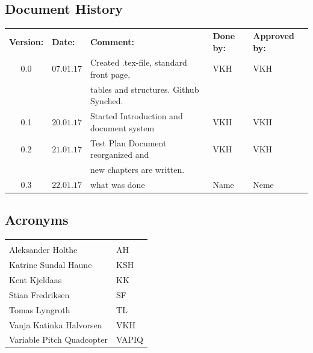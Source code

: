 \documentclass{article}
\begin{document}
\begin{center}
\section*{\textbf{Document History}}
\begin{tabular}{cllll}
\rowcolor{cadetgrey}
\textbf{Version:}    &\textbf{Date:} 	 &\textbf{Comment:}    &\textbf{Done by:}   &\textbf{Approved by:}  \\

0.0       & $07.01.17$   & Created .tex-file, standard front page, & VKH  & VKH \\
          &              & tables and structures. Github Synched.    &     & \\\rowcolor{gainsboro}
0.1       & $20.01.17$   & Started Introduction and document system  & VKH    & VKH          \\
0.2       & $21.01.17$   & Test Plan Document reorganized and  & VKH    & VKH          \\ 
          &              & new chapters are written.          &     &          \\ \rowcolor{gainsboro}
0.3       & $22.01.17$   & what was done  & Name    & Neme          \\
\end{tabular}                                                                   
\end{center}

\vspace*{3.0 cm}

\begin{center}
\section*{\textbf{Acronyms}}
\begin{tabular}{ll}
\rowcolor{cadetgrey}
    &   \\
Aleksander Holthe      & AH     
 \\\rowcolor{gainsboro}
Katrine Sundal Haune  & KSH \\
Kent Kjeldaas         & KK 
 \\\rowcolor{gainsboro}
Stian Fredriksen      & SF  \\
Tomas Lyngroth       & TL   
 \\\rowcolor{gainsboro}
Vanja Katinka Halvorsen     & VKH   \\
Variable Pitch Quadcopter   & VAPIQ
\end{tabular}                                                             
\end{center}
\end{document}
